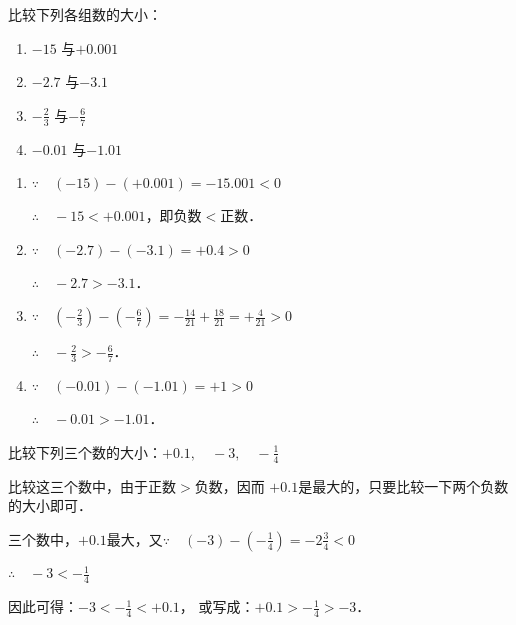 \begin{example}
	比较下列各组数的大小：
	\begin{multicols}{2}
		\begin{enumerate}
			\item $-15$ 与$+0.001$
			\item $-2.7$ 与$-3.1$
			\item $-\frac{2}{3}$ 与$-\frac{6}{7}$
			\item $-0.01$ 与$-1.01$
		\end{enumerate}
	\end{multicols}
\end{example}

\begin{solution}
	\begin{enumerate}
		\item $\because\quad (-15)-(+0.001)=-15.001<0$
		
		$\therefore\quad -15<+0.001$，即负数$<$正数．
		
		\item $\because\quad (-2.7)-(-3.1)=+0.4>0$
		
		$\therefore\quad -2.7>-3.1$．
		
		\item $\because\quad \left(-\frac{2}{3}\right)-\left(-\frac{6}{7}\right)=-\frac{14}{21}+\frac{18}{21}=+\frac{4}{21}>0$
		
		$\therefore\quad -\frac{2}{3}>-\frac{6}{7}$．
		
		\item $\because\quad (-0.01)-(-1.01)=+1>0$
		
		$\therefore\quad -0.01>-1.01$．
	\end{enumerate}    
\end{solution}

\begin{example}
	比较下列三个数的大小：$+0.1,\quad -3,\quad -\frac{1}{4}$
\end{example}

\begin{analyze}
	比较这三个数中，由于正数$>$负数，因而
	$+0.1$是最大的，只要比较一下两个负数的大小即可．
\end{analyze}

\begin{solution}
	三个数中，$+0.1$最大，又$\because\quad (-3)-\left(-\frac{1}{4}\right)=-2\frac{3}{4}<0$
	
	$\therefore\quad -3<-\frac{1}{4}$
	
	因此可得：$-3<-\frac{1}{4}<+0.1$，
	或写成：$+0.1>-\frac{1}{4}>-3$．
\end{solution}

